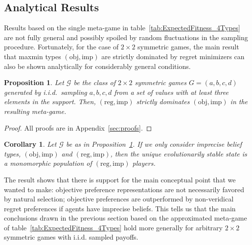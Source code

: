 \documentclass[fleqn,reqno,12pt]{article}
\theoremstyle{Satz}
\newtheorem{proposition}{Proposition}
\newtheorem{corollary}{Corollary}
\theoremstyle{Bsp}
\begin{document}
\subsection{Analytical Results}
\label{sec:analytical-results}

Results based on the single meta-game in table~\ref{tab:ExpectedFitness_4Types} are not fully general and possibly spoiled by random
fluctuations in the sampling procedure. Fortunately, for the case of $2 \times 2$ symmetric
games, the main result that maxmin types $(\text{obj}, \text{imp})$ are strictly dominated by regret minimizers can
also be shown analytically for considerably general conditions.

\begin{proposition} \label{proposition1}
  Let $\mathcal{G}$ be the class of $2 \times 2$ symmetric games $G=(a,b,c,d)$ generated by i.i.d.~sampling $a,b,c,d$ from a
  set of values with at least three elements in the support. Then,
  $(\text{reg}, \text{imp})$ strictly dominates $(\text{obj}, \text{imp})$ in the resulting
  meta-game.
\end{proposition}

\begin{proof}
All proofs are in Appendix~\ref{sec:proofs}.
\end{proof}

\begin{corollary} \label{corollary1} Let $\mathcal{G}$ be as in Proposition~\ref{proposition1}. If we only consider imprecise belief types, $(\text{obj}, \text{imp})$ and
  $(\text{reg}, \text{imp})$, then the unique evolutionarily stable state is a monomorphic population of
  $(\text{reg}, \text{imp})$ players.
\end{corollary}

The result shows that there is support for the main conceptual
point that we wanted to make: 
objective preference representations are not necessarily favored by natural selection;
objective preferences are outperformed by non-veridical regret preferences if agents
have imprecise beliefs.  This tells us that the main conclusions drawn in the previous section
based on the approximated meta-game of table~\ref{tab:ExpectedFitness_4Types} hold more
generally for arbitrary $2 \times 2$ symmetric games with i.i.d. sampled payoffs.
\end{document}
